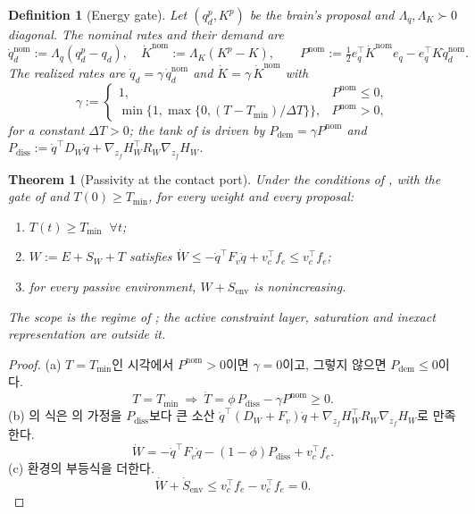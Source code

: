 \documentclass[11pt]{article}\usepackage[margin=1in]{geometry}\usepackage{amsmath,amssymb,amsthm,mathtools}\usepackage{graphicx}\graphicspath{{figures/}{../figures/}{figs/}{./}}\usepackage{enumitem}\usepackage{hyperref}\usepackage{cleveref}\usepackage{tikz}\usetikzlibrary{arrows.meta,positioning,calc,shapes.geometric}\usepackage{float}\usepackage{rotating}\usepackage[most]{tcolorbox}\usepackage{kotex}\usepackage{booktabs}\usepackage{longtable}\emergencystretch=1.6em\tolerance=2000 \crefname{assumption}{Assumption}{Assumptions}\Crefname{assumption}{Assumption}{Assumptions}\crefname{definition}{Definition}{Definitions}\Crefname{definition}{Definition}{Definitions}\crefname{proposition}{Proposition}{Propositions}\Crefname{proposition}{Proposition}{Propositions}\crefname{fact}{Fact}{Facts}\Crefname{fact}{Fact}{Facts} \newtheorem{assumption}{Assumption}\newtheorem{definition}{Definition}\newtheorem{lemma}{Lemma}\newtheorem{proposition}{Proposition}\newtheorem{theorem}{Theorem}\newtheorem{corollary}{Corollary}\newtheorem{fact}{Fact}\theoremstyle{remark}\newtheorem{remark}{Remark} \newcommand{\R}{\mathbb{R}}\newcommand{\xb}{\bar x}\newcommand{\Ab}{\bar A}\newcommand{\By}{\bar B_y}\newcommand{\U}{\mathcal U}\newcommand{\Z}{\mathcal Z}
\begin{document}
\begin{definition}[Energy gate]
\label{def:gate}
Let $(q_d^p,K^p)$ be the brain's proposal and $\Lambda_q,\Lambda_K\succ0$ diagonal. The nominal rates and their demand are
\[
\dot q_d^{\mathrm{nom}}:=\Lambda_q(q_d^p-q_d),\quad \dot K^{\mathrm{nom}}:=\Lambda_K(K^p-K),\qquad P^{\mathrm{nom}}:=\tfrac12e_q^\top\dot K^{\mathrm{nom}}e_q-e_q^\top K\dot q_d^{\mathrm{nom}} .
\]
The realized rates are $\dot q_d=\gamma\,\dot q_d^{\mathrm{nom}}$ and $\dot K=\gamma\,\dot K^{\mathrm{nom}}$ with
\[
\gamma:=\begin{cases}1,&P^{\mathrm{nom}}\le0,\\ \min\big\{1,\max\{0,(T-T_{\min})/\Delta T\}\big\},&P^{\mathrm{nom}}>0,\end{cases}
\]
for a constant $\Delta T>0$; the tank of  is driven by $P_{\mathrm{dem}}=\gamma P^{\mathrm{nom}}$ and $P_{\mathrm{diss}}:=\dot q^\top D_W\dot q+\nabla_{z_f}H_W^\top R_W\nabla_{z_f}H_W$.
\end{definition}

\begin{theorem}[Passivity at the contact port]
\label{thm:passive3}
Under the conditions of , with the gate of  and $T(0)\ge T_{\min}$, for every weight and every proposal:
\begin{enumerate}[label=(\alph*)]
\item $T(t)\ge T_{\min}$ $\ \forall t$;
\item $W:=E+S_W+T$ satisfies $\dot W\le-\dot q^\top F_v\dot q+v_c^\top f_e\le v_c^\top f_e$;
\item for every passive environment, $W+S_{\mathrm{env}}$ is nonincreasing.
\end{enumerate}
The scope is the regime of ; the active constraint layer, saturation and inexact representation are outside it.
\end{theorem}

\begin{proof}
(a) $T=T_{\min}$인 시각에서 $P^{\mathrm{nom}}>0$이면 $\gamma=0$이고, 그렇지 않으면 $P_{\mathrm{dem}}\le0$이다.
\[
T=T_{\min}\ \Longrightarrow\ \dot T=\phi\,P_{\mathrm{diss}}-\gamma P^{\mathrm{nom}}\ge0 .
\]
(b) 의 식은 의 가정을 $P_{\mathrm{diss}}$보다 큰 소산 $\dot q^\top(D_W+F_v)\dot q+\nabla_{z_f}H_W^\top R_W\nabla_{z_f}H_W$로 만족한다.
\[
\dot W=-\dot q^\top F_v\dot q-(1-\phi)P_{\mathrm{diss}}+v_c^\top f_e .
\]
(c) 환경의 부등식을 더한다.
\[
\dot W+\dot S_{\mathrm{env}}\le v_c^\top f_e-v_c^\top f_e=0 .
\]
\end{proof}
\end{document}
